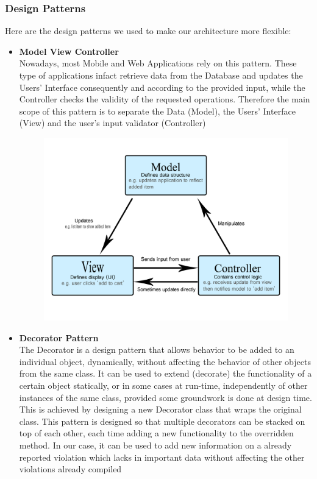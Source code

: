 \documentclass[12pt,a4paper]{article}
\begin{document}
\subsubsection{Design Patterns}
Here are the design patterns we used to make our architecture more flexible:
\begin{itemize}
\item \textbf{Model View Controller}\\
Nowadays, most Mobile and Web Applications rely on this pattern. These type of applications infact retrieve data from the Database and updates the Users' Interface consequently and according to the provided input, while the Controller checks the validity of the requested operations. Therefore the main scope of this pattern is to separate the Data (Model), the Users' Interface (View) and the user's input validator (Controller)
\begin{figure}[H]
		\centering
		\includegraphics[width=1.0\linewidth]{../assets/images/model-view-controller-light-blue.png}
	\end{figure}
\newpage
\item \textbf{Decorator Pattern}\\
The Decorator is a design pattern that allows behavior to be added to an individual object, dynamically, without affecting the behavior of other objects from the same class. It can be used to extend (decorate) the functionality of a certain object statically, or in some cases at run-time, independently of other instances of the same class, provided some groundwork is done at design time. This is achieved by designing a new Decorator class that wraps the original class. This pattern is designed so that multiple decorators can be stacked on top of each other, each time adding a new functionality to the overridden method. In our case, it can be used to add new information on a already reported violation which lacks in important data without affecting the other violations already compiled

\end{itemize}
\end{document}
